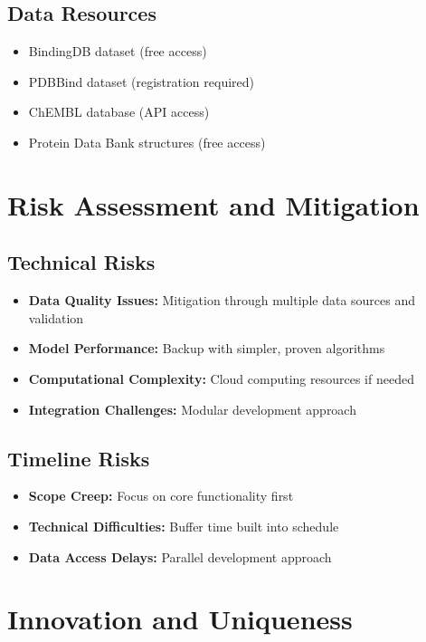 \documentclass[12pt,a4paper]{article}
\begin{document}
\subsection{Data Resources}
\begin{itemize}
    \item BindingDB dataset (free access)
    \item PDBBind dataset (registration required)
    \item ChEMBL database (API access)
    \item Protein Data Bank structures (free access)
\end{itemize}

\section{Risk Assessment and Mitigation}

\subsection{Technical Risks}
\begin{itemize}
    \item \textbf{Data Quality Issues:} Mitigation through multiple data sources and validation
    \item \textbf{Model Performance:} Backup with simpler, proven algorithms
    \item \textbf{Computational Complexity:} Cloud computing resources if needed
    \item \textbf{Integration Challenges:} Modular development approach
\end{itemize}

\subsection{Timeline Risks}
\begin{itemize}
    \item \textbf{Scope Creep:} Focus on core functionality first
    \item \textbf{Technical Difficulties:} Buffer time built into schedule
    \item \textbf{Data Access Delays:} Parallel development approach
\end{itemize}

\section{Innovation and Uniqueness}
\end{document}
